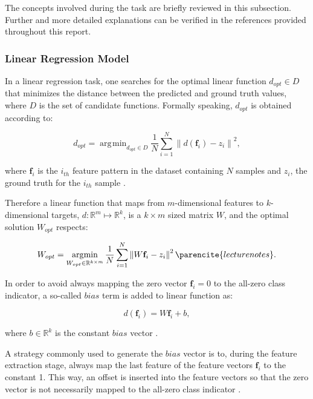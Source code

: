 \documentclass{article}
\DeclareMathOperator*{\argmin}{\arg\!\min}
\newcommand{\norm}[1]{\left\lVert#1\right\rVert}
\begin{document}
The concepts involved during the task are briefly reviewed in this subsection. Further and more detailed explanations can be verified in the references provided throughout this report.

\subsubsection{Linear Regression Model}

In a linear regression task, one searches for the optimal linear function $d_{opt} \in D$ that minimizes the distance between the predicted and ground truth values, where $D$ is the set of candidate functions. Formally speaking, $d_{opt}$ is obtained according to:

\begin{equation}
    d_{opt} = \argmin_{d_{opt} \in D} \frac{1}{N} \sum_{i=1}^{N} \norm{d(\mathbf{f}_i) - z_i}^2,
\end{equation}

\noindent
where $\mathbf{f}_i$ is the $i_{th}$ feature pattern in the dataset containing $N$ samples and $z_i$, the ground truth for the $i_{th}$ sample \parencite {lecturenotes}.

Therefore a linear function that maps from $m$-dimensional features to $k$-dimensional targets, $d: \mathbb{R}^m \mapsto \mathbb{R}^k$, is a $k \times m$ sized matrix $W$, and the optimal solution $W_{opt}$ respects:

\begin{equation}
    W_{opt} = \argmin_{W_{opt} \in {\mathbb{R}^{k \times m}}} \frac{1}{N} \sum_{i=1}^{N} \norm{W\mathbf{f}_i - z_i}^2 \parencite {lecturenotes}.
\end{equation}

In order to avoid always mapping the zero vector $\mathbf{f}_i = 0$ to the all-zero class indicator, a so-called $bias$ term is added to linear function as:

\begin{equation}
    d(\mathbf{f}_i) = W\mathbf{f}_i + b,
\end{equation}

\noindent
where $b \in \mathbb{R}^{k}$ is the constant $bias$ vector \parencite {lecturenotes}.

A strategy commonly used to generate the $bias$ vector is to, during the feature extraction stage, always map the last feature of the feature vectors $\mathbf{f}_i$ to the constant 1. This way, an offset is inserted into the feature vectors so that the zero vector is not necessarily mapped to the all-zero class indicator \parencite {lecturenotes}.
\end{document}
